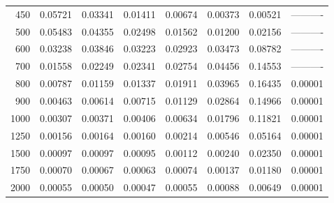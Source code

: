 \begin{table}[ht]
\begin{tabular}{r|c|c|c|c|c|c|c}
      450 & 0.05721 & 0.03341 & 0.01411 & 0.00674 & 0.00373 & 0.00521 & ---------- \\
      500 & 0.05483 & 0.04355 & 0.02498 & 0.01562 & 0.01200 & 0.02156 & ---------- \\
      600 & 0.03238 & 0.03846 & 0.03223 & 0.02923 & 0.03473 & 0.08782 & ---------- \\
      700 & 0.01558 & 0.02249 & 0.02341 & 0.02754 & 0.04456 & 0.14553 & ---------- \\
      800 & 0.00787 & 0.01159 & 0.01337 & 0.01911 & 0.03965 & 0.16435 & 0.00001 \\
      900 & 0.00463 & 0.00614 & 0.00715 & 0.01129 & 0.02864 & 0.14966 & 0.00001 \\
     1000 & 0.00307 & 0.00371 & 0.00406 & 0.00634 & 0.01796 & 0.11821 & 0.00001 \\
     1250 & 0.00156 & 0.00164 & 0.00160 & 0.00214 & 0.00546 & 0.05164 & 0.00001 \\
     1500 & 0.00097 & 0.00097 & 0.00095 & 0.00112 & 0.00240 & 0.02350 & 0.00001 \\
     1750 & 0.00070 & 0.00067 & 0.00063 & 0.00074 & 0.00137 & 0.01180 & 0.00001 \\
     2000 & 0.00055 & 0.00050 & 0.00047 & 0.00055 & 0.00088 & 0.00649 & 0.00001 \\ \cline{1-8}
    \end{tabular}
    \label{tab:XRayEffSDE2}
\end{table}

